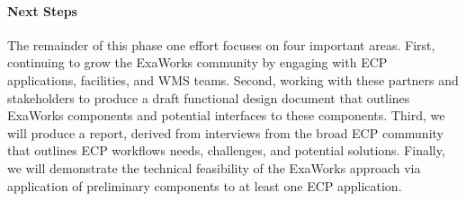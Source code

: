 \paragraph{Next Steps}
The remainder of this phase one effort focuses on four important areas. 
First, continuing to grow the ExaWorks community by engaging with ECP 
applications, facilities, and WMS teams. 
Second, working with these partners and stakeholders to produce a draft
functional design document that outlines ExaWorks components
and potential interfaces to these components. 
Third, we will produce a report, derived from interviews from 
the broad ECP community that outlines ECP workflows needs, challenges, 
and potential solutions. 
Finally, we will demonstrate the technical feasibility of the 
ExaWorks approach via application of preliminary components to
at least one ECP application. 
